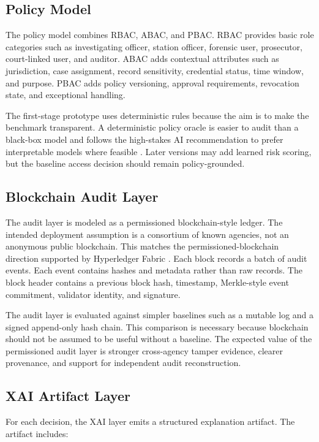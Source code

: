 \subsection{Policy Model}

The policy model combines RBAC, ABAC, and PBAC. RBAC provides basic role categories such as investigating officer, station officer, forensic user, prosecutor, court-linked user, and auditor. ABAC adds contextual attributes such as jurisdiction, case assignment, record sensitivity, credential status, time window, and purpose. PBAC adds policy versioning, approval requirements, revocation state, and exceptional handling.

The first-stage prototype uses deterministic rules because the aim is to make the benchmark transparent. A deterministic policy oracle is easier to audit than a black-box model and follows the high-stakes AI recommendation to prefer interpretable models where feasible \cite{rudin_2019}. Later versions may add learned risk scoring, but the baseline access decision should remain policy-grounded.

\subsection{Blockchain Audit Layer}

The audit layer is modeled as a permissioned blockchain-style ledger. The intended deployment assumption is a consortium of known agencies, not an anonymous public blockchain. This matches the permissioned-blockchain direction supported by Hyperledger Fabric \cite{androulaki_fabric_2018}. Each block records a batch of audit events. Each event contains hashes and metadata rather than raw records. The block header contains a previous block hash, timestamp, Merkle-style event commitment, validator identity, and signature.

The audit layer is evaluated against simpler baselines such as a mutable log and a signed append-only hash chain. This comparison is necessary because blockchain should not be assumed to be useful without a baseline. The expected value of the permissioned audit layer is stronger cross-agency tamper evidence, clearer provenance, and support for independent audit reconstruction.

\subsection{XAI Artifact Layer}

For each decision, the XAI layer emits a structured explanation artifact. The artifact includes:

